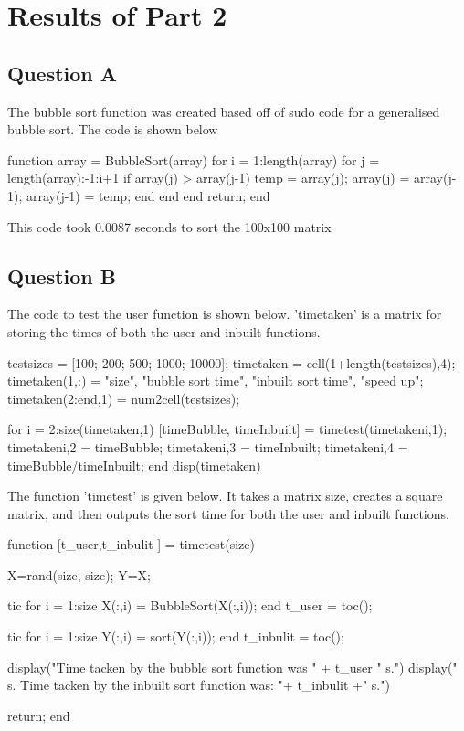 \section{Results of Part 2}

\subsection{Question A}
The bubble sort function was created based off of sudo code for a generalised bubble sort.
The code is shown below

\begin{Matlab}
 function array = BubbleSort(array)
  for i = 1:length(array)
   for j = length(array):-1:i+1
    if array(j) > array(j-1)
     temp = array(j);
     array(j) = array(j-1);
     array(j-1) = temp;
    end
   end
  end
 return;
 end
\end{Matlab}

This code took 0.0087 seconds to sort the 100x100 matrix

\subsection{Question B}
The code to test the user function is shown below.
'timetaken' is a matrix for storing the times of both the user and inbuilt functions.

\begin{Matlab}
 testsizes = [100; 200; 500; 1000; 10000];%
 timetaken = cell(1+length(testsizes),4);
 timetaken(1,:) = {"size", "bubble sort time", "inbuilt sort time", "speed up"};
 timetaken(2:end,1) = num2cell(testsizes); 

 for i = 2:size(timetaken,1)
  [timeBubble, timeInbuilt] = timetest(timetaken{i,1});
  timetaken{i,2} = timeBubble;
  timetaken{i,3} = timeInbuilt;
  timetaken{i,4} = timeBubble/timeInbuilt;
 end
 disp(timetaken)
\end{Matlab}

The function 'timetest' is given below.
It takes a matrix size, creates a square matrix, and then outputs the sort time for both the user and inbuilt functions.



\begin{Matlab}
 function [t_user,t_inbulit ] = timetest(size)

  X=rand(size, size);
  Y=X;

  tic
  for i = 1:size
   X(:,i) = BubbleSort(X(:,i));
  end
  t_user = toc();

  tic
  for i = 1:size
   Y(:,i) = sort(Y(:,i));
  end
  t_inbulit = toc();

  display("Time tacken by the bubble sort function was " + t_user " s.")
  display(" s. Time tacken by the inbuilt sort function was: "+  t_inbulit +" s.")

  return;
 end
\end{Matlab}

